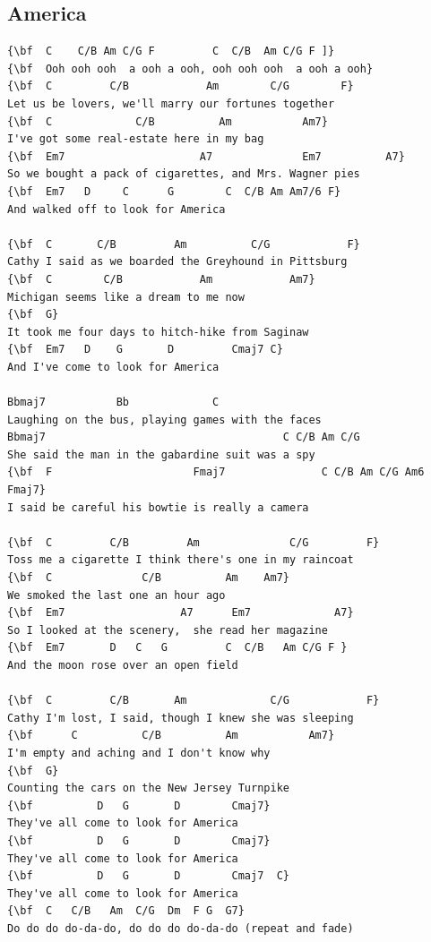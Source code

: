 \documentclass[a4paper]{article}
\begin{document}
\subsection{America}
\begin{Verbatim}[commandchars=\\\{\}]
{\bf  C    C/B Am C/G F         C  C/B  Am C/G F ]}
{\bf  Ooh ooh ooh  a ooh a ooh, ooh ooh ooh  a ooh a ooh}
{\bf  C         C/B            Am        C/G        F}
Let us be lovers, we'll marry our fortunes together
{\bf  C             C/B          Am           Am7}
I've got some real-estate here in my bag
{\bf  Em7                     A7              Em7          A7}
So we bought a pack of cigarettes, and Mrs. Wagner pies
{\bf  Em7   D     C      G        C  C/B Am Am7/6 F}
And walked off to look for America

{\bf  C       C/B         Am          C/G            F}
Cathy I said as we boarded the Greyhound in Pittsburg
{\bf  C        C/B            Am            Am7}
Michigan seems like a dream to me now
{\bf  G}
It took me four days to hitch-hike from Saginaw
{\bf  Em7   D    G       D         Cmaj7 C}
And I've come to look for America

Bbmaj7           Bb             C
Laughing on the bus, playing games with the faces
Bbmaj7                                     C C/B Am C/G
She said the man in the gabardine suit was a spy
{\bf  F                      Fmaj7               C C/B Am C/G Am6 Fmaj7}
I said be careful his bowtie is really a camera

{\bf  C         C/B         Am              C/G         F}
Toss me a cigarette I think there's one in my raincoat
{\bf  C              C/B          Am    Am7}
We smoked the last one an hour ago
{\bf  Em7                  A7      Em7             A7}
So I looked at the scenery,  she read her magazine
{\bf  Em7       D   C   G         C  C/B   Am C/G F }
And the moon rose over an open field

{\bf  C         C/B       Am             C/G            F}
Cathy I'm lost, I said, though I knew she was sleeping
{\bf      C          C/B          Am           Am7}
I'm empty and aching and I don't know why
{\bf  G}
Counting the cars on the New Jersey Turnpike
{\bf          D   G       D        Cmaj7}
They've all come to look for America
{\bf          D   G       D        Cmaj7}
They've all come to look for America
{\bf          D   G       D        Cmaj7  C}
They've all come to look for America
{\bf  C   C/B   Am  C/G  Dm  F G  G7}
Do do do do-da-do, do do do do-da-do (repeat and fade)

\end{Verbatim}
\newpage
\end{document}
